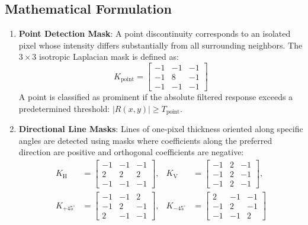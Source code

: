 \documentclass[12pt]{article}
\begin{document}
\subsection{Mathematical Formulation}
\begin{enumerate}
    \item \textbf{Point Detection Mask}: A point discontinuity corresponds to an isolated pixel whose intensity differs substantially from all surrounding neighbors. The $3 \times 3$ isotropic Laplacian mask is defined as:
    \begin{equation}
    K_{\text{point}} = \begin{bmatrix} -1 & -1 & -1 \\ -1 & 8 & -1 \\ -1 & -1 & -1 \end{bmatrix}
    \end{equation}
    A point is classified as prominent if the absolute filtered response exceeds a predetermined threshold: $|R(x, y)| \ge T_{\text{point}}$.

    \item \textbf{Directional Line Masks}: Lines of one-pixel thickness oriented along specific angles are detected using masks where coefficients along the preferred direction are positive and orthogonal coefficients are negative:
    \begin{align}
    K_{\text{H}} &= \begin{bmatrix} -1 & -1 & -1 \\ 2 & 2 & 2 \\ -1 & -1 & -1 \end{bmatrix}, &
    K_{\text{V}} &= \begin{bmatrix} -1 & 2 & -1 \\ -1 & 2 & -1 \\ -1 & 2 & -1 \end{bmatrix}, \\
    K_{+45^\circ} &= \begin{bmatrix} -1 & -1 & 2 \\ -1 & 2 & -1 \\ 2 & -1 & -1 \end{bmatrix}, &
    K_{-45^\circ} &= \begin{bmatrix} 2 & -1 & -1 \\ -1 & 2 & -1 \\ -1 & -1 & 2 \end{bmatrix}
    \end{align}
\end{enumerate}
\end{document}
